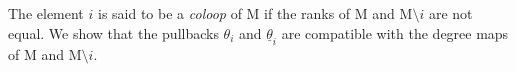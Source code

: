 \documentclass[11pt,reqno]{amsart}
\theoremstyle{definition}
\newtheorem{lemma}[theorem]{Lemma}
\theoremstyle{remark}
\renewcommand{\(}{\left(}
\renewcommand{\)}{\right)}
\newcommand{\<}{\left<}
\renewcommand{\>}{\right>}
\newcommand{\rk}{\operatorname{rk}}
\begin{document}
The element $i$ is said to be a \emph{coloop} of $\mathrm{M}$ if the ranks of $\mathrm{M}$ and $\mathrm{M} \setminus i$ are not equal.
We show that the pullbacks $\theta_i$ and $\underline{\theta}_i$ are compatible with the degree maps of $\mathrm{M}$ and $\mathrm{M} \setminus i$.




\end{document}
